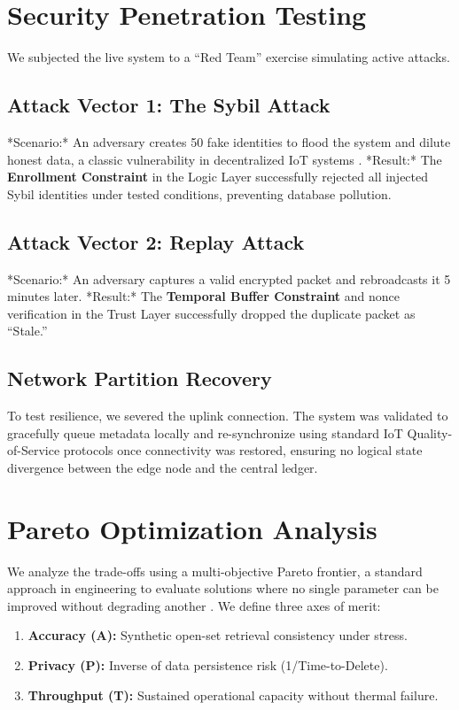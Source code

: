 \documentclass[conference]{IEEEtran}
\begin{document}
\section{Security Penetration Testing}
We subjected the live system to a ``Red Team'' exercise simulating active attacks.

\subsection{Attack Vector 1: The Sybil Attack}
*Scenario:* An adversary creates 50 fake identities to flood the system and dilute honest data, a classic vulnerability in decentralized IoT systems \cite{b9}.
*Result:* The \textbf{Enrollment Constraint} in the Logic Layer successfully rejected all injected Sybil identities under tested conditions, preventing database pollution.

\subsection{Attack Vector 2: Replay Attack}
*Scenario:* An adversary captures a valid encrypted packet and rebroadcasts it 5 minutes later.
*Result:* The \textbf{Temporal Buffer Constraint} and nonce verification in the Trust Layer successfully dropped the duplicate packet as ``Stale.''

\subsection{Network Partition Recovery}
To test resilience, we severed the uplink connection. The system was validated to gracefully queue metadata locally and re-synchronize using standard IoT Quality-of-Service protocols once connectivity was restored, ensuring no logical state divergence between the edge node and the central ledger.

\section{Pareto Optimization Analysis}

We analyze the trade-offs using a multi-objective Pareto frontier, a standard approach in engineering to evaluate solutions where no single parameter can be improved without degrading another \cite{b19}. We define three axes of merit:
\begin{enumerate}
    \item \textbf{Accuracy (A):} Synthetic open-set retrieval consistency under stress.
    \item \textbf{Privacy (P):} Inverse of data persistence risk (1/Time-to-Delete).
    \item \textbf{Throughput (T):} Sustained operational capacity without thermal failure.
\end{enumerate}
\end{document}
